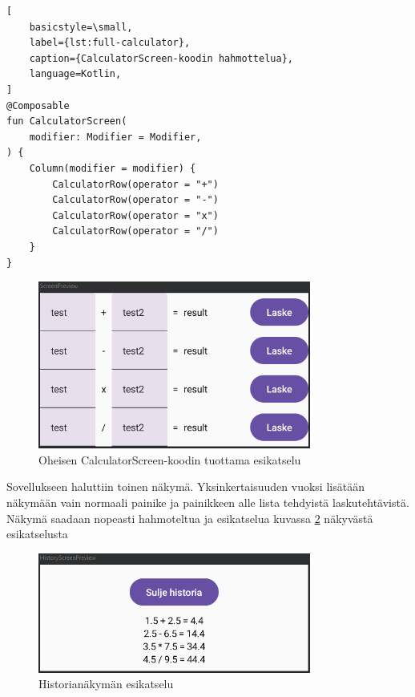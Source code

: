 \begin{lstlisting}[
    basicstyle=\small,
    label={lst:full-calculator},
    caption={CalculatorScreen-koodin hahmottelua},
    language=Kotlin,
]
@Composable
fun CalculatorScreen(
    modifier: Modifier = Modifier,
) {
    Column(modifier = modifier) {
        CalculatorRow(operator = "+")
        CalculatorRow(operator = "-")
        CalculatorRow(operator = "x")
        CalculatorRow(operator = "/")
    }
}
\end{lstlisting}

\begin{figure}[h!]
    \centering
    \includegraphics[width=0.8\textwidth]{figures/exercise-5-calculator-preview.png}
    \caption{Oheisen CalculatorScreen-koodin tuottama esikatselu}
    \label{fig:exercise-5-calculator-preview}
\end{figure}

Sovellukseen haluttiin toinen näkymä. Yksinkertaisuuden vuoksi lisätään näkymään
vain normaali painike ja painikkeen alle lista tehdyistä laskutehtävistä. Näkymä
saadaan nopeasti hahmoteltua ja esikatselua kuvassa
\ref{fig:exercise-5-history-preview} näkyvästä esikatselusta

\begin{figure}[h!]
    \centering
    \includegraphics[width=0.8\textwidth]{figures/exercise-5-history-preview.png}
    \caption{Historianäkymän esikatselu}
    \label{fig:exercise-5-history-preview}
\end{figure}

